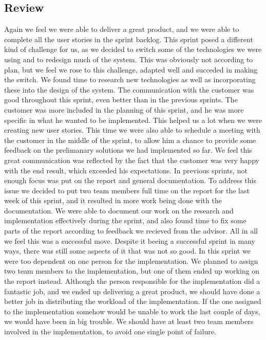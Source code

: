 \subsection{Review}
Again we feel we were able to deliver a great product, and we were able to complete all the user stories in the sprint backlog. This sprint posed a different kind of challenge for us, as we decided to switch some of the technologies we were using and to redesign much of the system. This was obviously not according to plan, but we feel we rose to this challenge, adapted well and succeded in making the switch. We found time to research new technologies as well as incorporating these into the design of the system.
\newline
\newline
The communication with the customer was good throughout this sprint, even better than in the previous sprints. The customer was more included in the planning of this sprint, and he was more specific in what he wanted to be implemented. This helped us a lot when we were creating new user stories. This time we were also able to schedule a meeting with the customer in the middle of the sprint, to allow him a chance to provide some feedback on the prelimanary solutions we had implemented so far. We feel this great communication was reflected by the fact that the customer was very happy with the end result, which exceeded his expectations.
\newline
\newline
In previous sprints, not enough focus was put on the report and general documentation. To address this issue we decided to put two team members full time on the report for the last week of this sprint, and it resulted in more work being done with the documentation. We were able to document our work on the research and implementation effectively during the sprint, and also found time to fix some parts of the report according to feedback we recieved from the advisor. All in all we feel this was a successful move.
\newline
\newline
Despite it beeing a successful sprint in many ways, there was still some aspects of it that was not so good. In this sprint we were too dependent on one person for the implementation. We planned to assign two team members to the implementation, but one of them ended up working on the report instead. Although the person responsible for the implementation did a fantastic job, and we ended up delivering a great product, we should have done a better job in distributing the workload of the implementation. If the one assigned to the implementation somehow would be unable to work the last couple of days, we would have been in big trouble. We should have at least two team members involved in the implementation, to avoid one single point of failure.
